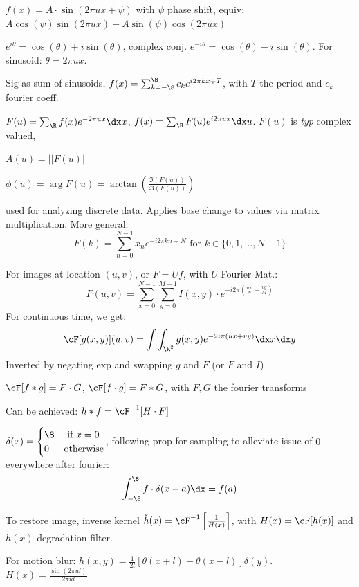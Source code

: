 \shortdefinition[Sinusoid] $f(x) = A \cdot \sin(2 \pi ux + \psi)$ with $\psi$ phase shift, equiv: $A \cos(\psi) \sin(2\pi ux) + A \sin(\psi)\cos(2\pi ux)$

 $e^{i \theta} = \cos(\theta) + i \sin(\theta)$, complex conj. $e^{-i \theta} = \cos(\theta) - i \sin(\theta)$. For sinusoid: $\theta = 2\pi ux$.

 Sig as sum of sinusoids, $f(x) = \sum_{k = -\8}^{\8} c_k e^{i 2\pi kx \div T}$, with $T$ the period and $c_k$ fourier coeff.

 $F(u) = \sum_{\R} f(x)e^{-2\pi ux} \dx x$, $f(x) = \sum_{\R} F(u) e^{i 2\pi ux} \dx u$. $F(u)$ is \textit{typ} complex valued,

 $A(u) = ||F(u)||$

 $\phi(u) = \arg F(u) = \arctan\left( \frac{\mathfrak{I}(F(u))}{\mathfrak{R}(F(u))} \right)$

\shortdefinition[DFT] used for analyzing discrete data. Applies base change to values via matrix multiplication.
More general:
\[
    F(k) = \sum_{n = 0}^{N - 1} x_n e^{-i 2\pi kn \div N} \text{ for } k \in \{ 0, 1, \ldots, N - 1 \}
\]

For images at location $(u, v)$, or $F = Uf$, with $U$ Fourier Mat.:
\[
    F(u, v) = \sum_{x = 0}^{N - 1}\sum_{y = 0}^{M - 1} I(x, y) \cdot e^{-i2\pi\left( \frac{ux}{N} + \frac{vy}{M} \right)}
\]
For continuous time, we get:
\[
    \cF[g(x, y)](u, v) = \int \int_{\R^2} g(x, y) e^{-2i\pi (ux + vy)} \dx x \dx y
\]
Inverted by negating exp and swapping $g$ and $F$ (or $F$ and $I$)

\shorttheorem[Convolution] $\cF[f * g] = F \cdot G$, $\cF[f \cdot g] = F * G$, with $F, G$ the fourier transforms

\shortremark[Filtering] Can be achieved: $h * f = \cF^{-1}[H \cdot F]$

 $\delta(x) = \begin{cases}
        \8 & \text{ if }x = 0 \\
        0  & \text{otherwise}
    \end{cases}$,
following prop for sampling to alleviate issue of $0$ everywhere after fourier:
\[
    \int_{-\8}^{\8} f \cdot \delta(x - a) \dx = f(a)
\]

\shortremark[Restoration] To restore image, inverse kernel $\tilde{h}(x) = \cF^{-1}\left[ \frac{1}{H(x)} \right]$, with $H(x) = \cF[h(x)]$
and $h(x)$ degradation filter.

\shortexample For motion blur: $h(x, y) = \frac{1}{2l} [\theta(x + l) - \theta(x -l)]\delta(y)$. $H(x) = \frac{\sin(2\pi ul)}{2\pi ul}$
